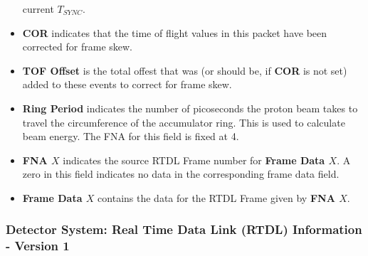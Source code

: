 \begin{itemize}
current $T_{SYNC}$.
\item{\bf COR} indicates that the time of flight values in this packet have
been corrected for frame skew.
\item{\bf TOF Offset} is the total offest that was (or should be, if {\bf COR}
is not set) added to these events to correct for frame skew.
\item{\bf Ring Period} indicates the number of picoseconds the proton beam
takes to travel the circumference of the accumulator ring. This is used
to calculate beam energy. The FNA for this field is fixed at 4.
\item{\bf FNA $X$} indicates the source RTDL Frame number for
{\bf Frame Data $X$}. A zero in this field indicates no data in
the corresponding frame data field.
\item{\bf Frame Data $X$} contains the data for the RTDL Frame given by
{\bf FNA $X$}.
\end{itemize}


\newpage
\subsubsection{Detector System: Real Time Data Link (RTDL) Information - Version 1}
\label{section:protocol_rtdl_packet_v1}

